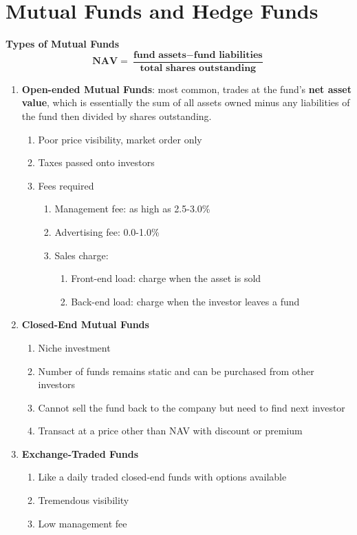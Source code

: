 \documentclass[11pt,fleqn]{report} %
\numberwithin{equation}{section} %
\numberwithin{figure}{section} %
\numberwithin{table}{section} %
\begin{document}
\chapter{Mutual Funds and Hedge Funds}
\begin{definition}\textbf{Types of Mutual Funds}
$$
\textbf{NAV}=\frac{\textbf{fund assets}-\textbf{fund liabilities}}{\textbf{total shares outstanding}}
$$
\begin{enumerate}
    \item \textbf{Open-ended Mutual Funds}: most common, trades at the fund's \textbf{net asset value}, which is essentially the sum of all assets owned minus any liabilities of the fund then divided by shares outstanding.
    \begin{enumerate}
        \item Poor price visibility, market order only
        \item Taxes passed onto investors
        \item Fees required
        \begin{enumerate}
            \item Management fee: as high as 2.5-3.0\%
            \item Advertising fee: 0.0-1.0\%
            \item Sales charge:
            \begin{enumerate}
                \item Front-end load: charge when the asset is sold
                \item Back-end load: charge when the investor leaves a fund
            \end{enumerate}
        \end{enumerate}
    \end{enumerate}
    \item \textbf{Closed-End Mutual Funds}
    \begin{enumerate}
        \item Niche investment
        \item Number of funds remains static and can be purchased from other investors
        \item Cannot sell the fund back to the company but need to find next investor
        \item Transact at a price other than NAV with discount or premium
    \end{enumerate}
    \item \textbf{Exchange-Traded Funds}
    \begin{enumerate}
        \item Like a daily traded closed-end funds with options available
        \item Tremendous visibility
        \item Low management fee
    \end{enumerate}
\end{enumerate}
\end{definition}
\end{document}
